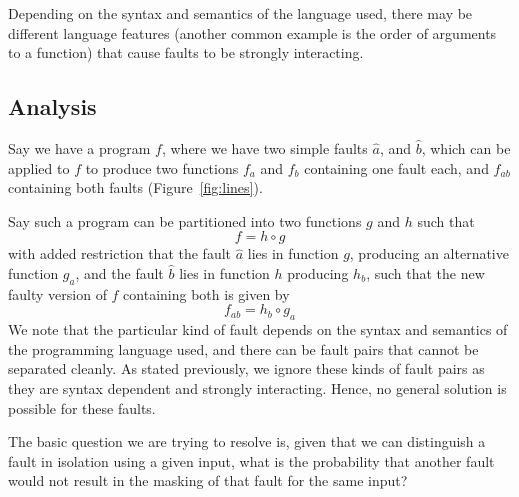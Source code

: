 \documentclass[preprint,nonatbib]{sigplanconf}\usepackage[]{graphicx}\usepackage[]{color}
\begin{document}
\begin{comment}
For example consider the following function, and the test cases:
\begin{lstlisting}
  def not3(a):
 o)  return a != 3
m1)  return a >  3
m2)  return a != 2
m3)  return a >  2

                    m1 m2 m3
                    --------
t1) not3(1) = T :   F, T, T

t2) not3(4) = T :   T, F, T
t3) not3(5) = T :   T, T, T
\end{lstlisting}

As before, $m1$ and $m2$ are constituent faults of $m3$. The test $t1$ detects
$m1$, and test $t2$ detects $m2$. But $m3$ is triggered by neither alone, but
combined to $m3$ it triggers $t3$.

\end{comment}
Depending on the syntax and semantics of the language used, there may be
different language features
(another common example is the order of arguments to a function)
that cause faults to be strongly interacting.

\subsection{Analysis}
Say we have a program $f$, where we
have two simple faults $\hat{a}$, and $\hat{b}$, which can be
applied to $f$ to produce two functions $f_a$ and $f_b$ containing one fault
each, and $f_{ab}$ containing both faults (Figure~\ref{fig:lines}).

Say such a program can be partitioned into two functions $g$ and $h$ such that
\[
  f = h \circ g
\]
with added restriction that the fault $\hat{a}$ lies in function $g$,
producing an alternative function $g_a$, and the
fault $\hat{b}$ lies in function $h$ producing $h_b$, such that the new faulty
version of $f$ containing both is given by
\[
  f_{ab} = h_b \circ g_a
\]
We note that the particular kind of fault depends on the syntax and semantics
of the programming language used, and there can be fault pairs that cannot be
separated cleanly. As stated previously, we ignore these kinds of fault pairs
as they are syntax dependent and strongly interacting. Hence, no general
solution is possible for these faults.

The basic question we are trying to resolve is, given that we can distinguish
a fault in isolation using a given input, what is the probability that
another fault would not result in the masking of that fault for the same input?
\end{document}
